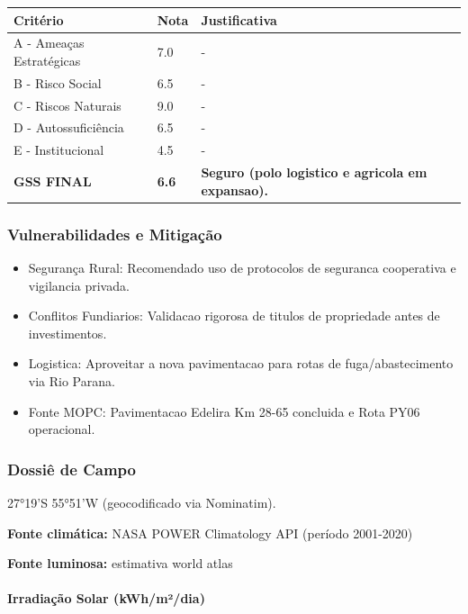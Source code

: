 \begin{table}[ht!]
\small \begin{tabular}{p{3.0cm}p{0.8cm}p{6.0cm}} \toprule
\textbf{Critério} & \textbf{Nota} & \textbf{Justificativa} \\ \midrule
A - Ameaças Estratégicas & 7.0 & - \\
B - Risco Social & 6.5 & - \\
C - Riscos Naturais & 9.0 & - \\
D - Autossuficiência & 6.5 & - \\
E - Institucional & 4.5 & - \\
\midrule \textbf{GSS FINAL} & \textbf{6.6} & \textbf{Seguro (polo logistico e agricola em expansao).} \\ \bottomrule \end{tabular}
\end{table}
\subsubsection{Vulnerabilidades e
Mitigação}

\begin{itemize}
\item
  Segurança Rural: Recomendado uso de protocolos de seguranca
  cooperativa e vigilancia privada.
\item
  Conflitos Fundiarios: Validacao rigorosa de titulos de propriedade
  antes de investimentos.
\item
  Logistica: Aproveitar a nova pavimentacao para rotas de
  fuga/\allowbreak abastecimento via Rio Parana.
\item
  Fonte MOPC: Pavimentacao Edelira Km 28-65 concluida e Rota PY06
  operacional.
\end{itemize}
\subsubsection{Dossiê de Campo}
\begin{description}[style=nextline,leftmargin=0.5cm,font=\bfseries]
\item[Coordenadas]  27°19'S 55°51'W (geocodificado via Nominatim).
\end{description}
\textbf{Fonte climática:} NASA POWER Climatology API (período 2001-2020)

\textbf{Fonte luminosa:} estimativa world atlas

\paragraph{Irradiação Solar
(kWh/\allowbreak m²/\allowbreak dia)}

